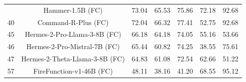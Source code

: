 \documentclass{article}
\begin{document}
\begin{table}[ht]
{\begin{tabular}{ccccccc}
\rowcolor[HTML]{EFEFEF} & Hammer-1.5B (FC) & 73.04 & 65.53 & 75.86 & 72.18 & 92.68 \\
40 & Command-R-Plus (FC) & 72.04 & 66.32 & 77.41 & 52.75 & 92.68 \\
45 & Hermes-2-Pro-Llama-3-8B (FC) & 66.18 & 64.18 & 74.05 & 55.16 & 53.66 \\
46 & Hermes-2-Pro-Mistral-7B (FC) & 65.44 & 60.82 & 74.25 & 38.55 & 75.61 \\
47 & Hermes-2-Theta-Llama-3-8B (FC) & 64.83 & 61.08 & 72.54 & 62.66 & 51.22 \\
57 & FireFunction-v1-46B (FC) & 48.11 & 38.16 & 41.20 & 68.55 & 95.12 \\
\bottomrule
\end{tabular}
}
\end{table}
\end{document}
